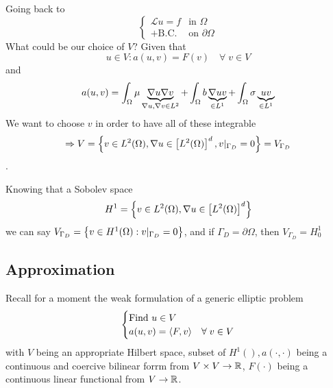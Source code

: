 Going back to 
\begin{equation*}
    \begin{cases}
        \mathcal{L}u = f & \text{in }\Omega \\
        + \text{B.C.} & \text{on }\partial\Omega
    \end{cases}
\end{equation*}
What could be our choice of \(V\)? Given that
\[
    u\in V : a(u,v) = F(v) \quad \forall \; v \in V
\]
and 
\[
    a(u,v) = \int_\Omega \mu \underbrace{\nabla u \nabla v}_{\nabla u, \nabla v \in L^2} + \int_\Omega b \underbrace{\nabla u v}_{\in L^1} + \int_\Omega \sigma \underbrace{u v}_{\in L^1}
\]
We want to choose \(v\) in order to have all of these integrable \[\Rightarrow V = \left\{v \in L^2(\Omega), \nabla u \in \left[L^2(\Omega)\right]^d, v\vert_{\Gamma_D} = 0\right\} = V_{\Gamma_D}\].

Knowing that a Sobolev space 
\[
    H^1 = \left\{v \in L^2(\Omega), \nabla u \in \left[L^2(\Omega)\right]^d\right\}
\]
we can say \(V_{\Gamma_D} = \left\{v \in H^1(\Omega): v\vert_{\Gamma_D}= 0\right\}\), and if \(\Gamma_D = \partial\Omega\), then \(V_{\Gamma_D} = H^1_0\)
\subsection{Approximation}
Recall for a moment the weak formulation of a generic elliptic problem 
\begin{equation}
    \begin{cases}
        \text{Find } u \in V \\
        a(u,v) = \langle F,v \rangle & \forall \; v \in V \label{Weak Formulation of Boundary Value Problems - 2}
    \end{cases}
\end{equation}
with \(V\) being an appropriate Hilbert space, subset of \(H^1(), a(\cdot,\cdot)\) being a continuous and coercive bilinear forrm from \(V \times V \to \mathbb{R}\), \(F(\cdot)\) being a continuous linear functional from \(V \to \mathbb{R}\).

